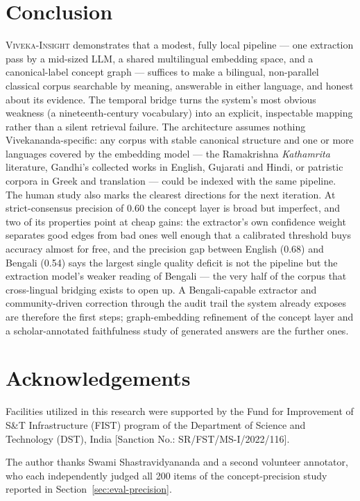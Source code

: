 \documentclass[11pt,a4paper]{article}
\newcommand{\system}{\textsc{Viveka-Insight}}
\begin{document}
\section{Conclusion}

\system{} demonstrates that a modest, fully local pipeline --- one
extraction pass by a mid-sized LLM, a shared multilingual embedding
space, and a canonical-label concept graph --- suffices to make a
bilingual, non-parallel classical corpus searchable by meaning,
answerable in either language, and honest about its evidence. The
temporal bridge turns the system's most obvious weakness (a
nineteenth-century vocabulary) into an explicit, inspectable mapping
rather than a silent retrieval failure. The architecture assumes nothing
Vivekananda-specific: any corpus with stable canonical structure and one
or more languages covered by the embedding model --- the Ramakrishna
\emph{Kathamrita} literature, Gandhi's collected works in English,
Gujarati and Hindi, or patristic corpora in Greek and translation ---
could be indexed with the same pipeline. The human study also marks the
clearest directions for the next iteration. At strict-consensus precision
of 0.60 the concept layer is broad but imperfect, and two of its
properties point at cheap gains: the extractor's own confidence weight
separates good edges from bad ones well enough that a calibrated
threshold buys accuracy almost for free, and the precision gap between
English (0.68) and Bengali (0.54) says the largest single quality deficit
is not the pipeline but the extraction model's weaker reading of Bengali
--- the very half of the corpus that cross-lingual bridging exists to
open up. A Bengali-capable extractor and community-driven correction
through the audit trail the system already exposes are therefore the
first steps; graph-embedding refinement of the concept layer and a
scholar-annotated faithfulness study of generated answers are the
further ones.

\section*{Acknowledgements}

Facilities utilized in this research were supported by the Fund for
Improvement of S\&T Infrastructure (FIST) program of the Department of
Science and Technology (DST), India [Sanction No.: SR/FST/MS-I/2022/116].

The author thanks Swami Shastravidyananda and a second volunteer
annotator, who each independently judged all 200 items of the
concept-precision study reported in Section~\ref{sec:eval-precision}.
\end{document}

